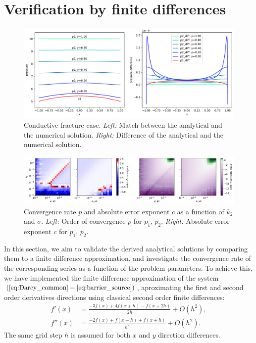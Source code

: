 \documentclass[sn-mathphys,Numbered]{sn-jnl}
\begin{document}
\section{Verification by finite differences}
\label{sec:verify}

\begin{figure}[h]
  
  \centering
  \includegraphics[width=\textwidth]{figs/continuous_solution.pdf}
  \caption{Conductive fracture case. 
  {\it Left:} Match between the analytical and the numerical solution. 
  {\it Right:} Difference of the analytical and the numerical solution.}
  \label{fig:cont_solution}
\end{figure}



\begin{figure}
  
  \centering
  \includegraphics[width=\textwidth]{figs/continuous_conv_rate.pdf}
  \caption{Convergence rate $p$ and absolute error exponent $c$ as a function of $k_2$ and $\sigma$. 
  {\it Left:} Order of convergence $p$ for $p_1$, $p_2$.
  {\it Right:} Absolute error exponent $c$ for $p_1$, $p_2$.}
  \label{fig:cont_rate}
\end{figure}





In this section, we aim to validate the derived analytical solutions by comparing them to a finite difference approximation, and investigate the convergence rate of the corresponding series as a function of the problem parameters. To achieve this, we have implemented the finite difference approximation of the system 
$(\ref{eq:Darcy_common} - \ref{eq:barrier_source})$, aproximating the first and second order derivatives directions using classical second order finite differences:
\begin{align*}
f'(x) &= \frac{-3 f(x) + 4f(x+h) - f(x+2h)}{2h} + O(h^2),\\
f''(x) &= \frac{-2 f(x) + f(x-h) + f(x+h)}{h^2} + O(h^2).
\end{align*}
The same grid step $h$ is assumed for both $x$ and $y$ direction
differences.
\end{document}
